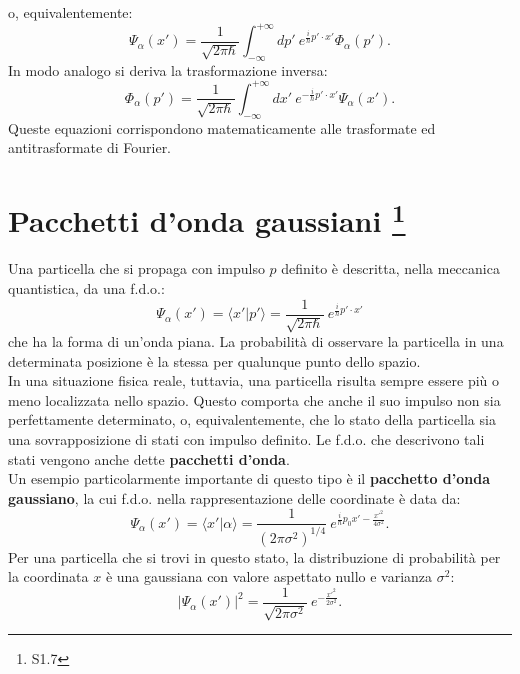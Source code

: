 o, equivalentemente:
\begin{equation}
\Psi_\alpha (x') = \frac{1}{\sqrt{2 \pi \hbar}} \int_{-\infty}^{+\infty} dp' ~ e^{\frac{i}{\hbar}p' \cdot x'} \Phi_\alpha (p').
\end{equation}
In modo analogo si deriva la trasformazione inversa:
\begin{equation}
\Phi_\alpha (p') = \frac{1}{\sqrt{2 \pi \hbar}} \int_{-\infty}^{+\infty} dx' ~ e^{-\frac{i}{\hbar}p' \cdot x'} \Psi_\alpha (x').
\end{equation}
Queste equazioni corrispondono matematicamente alle trasformate ed antitrasformate di Fourier.
\section[Pacchetti d'onda gaussiani]{Pacchetti d'onda gaussiani \footnote{S1.7}}
Una particella che si propaga con impulso $p$ definito è descritta, nella meccanica quantistica, da una f.d.o.:
\begin{equation}
\Psi_\alpha (x') = \langle x' | p' \rangle = \frac{1}{\sqrt{2 \pi \hbar}}~  e^{\frac{i}{\hbar}p' \cdot x'}
\end{equation}
che ha la forma di un'onda piana. La probabilità di osservare la particella in una determinata posizione è la stessa per qualunque punto dello spazio.\\
In una situazione fisica reale, tuttavia, una particella risulta sempre essere più o meno localizzata nello spazio. Questo comporta che anche il suo impulso non sia perfettamente determinato, o, equivalentemente, che lo stato della particella sia una sovrapposizione di stati con impulso definito. Le f.d.o. che descrivono tali stati vengono anche dette \textbf{pacchetti d'onda}.\\
Un esempio particolarmente importante di questo tipo è il \textbf{pacchetto d'onda gaussiano}, la cui f.d.o. nella rappresentazione delle coordinate è data da:
\begin{equation}
\Psi_\alpha (x') = \langle x' | \alpha \rangle = \frac{1}{(2 \pi \sigma^2)^{1/4}}~  e^{\frac{i}{\hbar}p_0 x' - \frac{x'^2}{4 \sigma^2}}.
\end{equation}
Per una particella che si trovi in questo stato, la distribuzione di probabilità per la coordinata $x$ è una gaussiana con valore aspettato nullo e varianza $\sigma^2$:
\begin{equation}
|\Psi_\alpha (x')|^2 = \frac{1}{\sqrt{2 \pi \sigma^2}}~   e^{- \frac{x'^2}{2 \sigma^2}}.
\end{equation}
